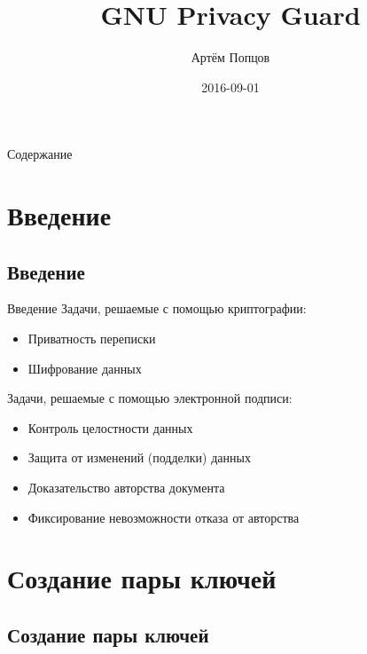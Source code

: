 \documentclass[presentation]{beamer}
\author{Артём Попцов}
\date{2016-09-01}
\title{GNU Privacy Guard}
\begin{document}
\maketitle



\begin{frame}{Содержание}
  \setcounter{tocdepth}{1}
  \tableofcontents
\end{frame}



\section{Введение}

\subsection{Введение}

\begin{frame}{Введение}
  Задачи, решаемые с помощью криптографии:
\begin{itemize}
\item Приватность переписки
\item Шифрование данных\newline
\end{itemize}

Задачи, решаемые с помощью электронной подписи:
\begin{itemize}
\item Контроль целостности данных
\item Защита от изменений (подделки) данных
\item Доказательство авторства документа
\item Фиксирование невозможности отказа от авторства
\end{itemize}
\end{frame}


\section{Создание пары ключей}

\subsection{Создание пары ключей}
\end{document}
